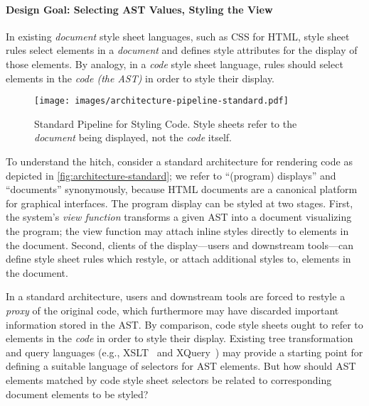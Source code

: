 \documentclass[acmsmall, screen]{acmart}
\newcommand{\parahead}[1]
  {\paragraph{\textbf{#1}}}
\begin{document}
\parahead{Design Goal: Selecting AST Values, Styling the View}

In existing \emph{document} style sheet languages, such as CSS for HTML, style sheet rules select elements in a \emph{document} and defines style attributes for the display of those elements.
By analogy, in a \emph{code} style sheet language,
rules should select elements in the \emph{code (the AST)} in order to style their display.

\begin{wrapfigure}[12]{r}{2.3in}
  \vspace{-0.09in} \texttt{[image: images/architecture-pipeline-standard.pdf]}
  \caption{
Standard Pipeline for Styling Code.
  Style sheets refer to the \emph{document} being displayed,
  not the \emph{code} itself.
}
  \label{fig:architecture-standard}
\end{wrapfigure}
 To understand the hitch, consider a standard architecture for rendering code as depicted in \autoref{fig:architecture-standard};
we refer to ``(program) displays'' and ``documents'' synonymously, because HTML documents are a canonical platform for graphical interfaces.
The program display can be styled at two stages.
First, the system's \emph{view function} transforms a given AST into a document visualizing the program; the view function may attach {inline styles} directly to elements in the document.
Second, clients of the display---users and downstream tools---can define style sheet rules which restyle, or attach {additional styles} to, elements in the document.


In a standard architecture,
users and downstream tools are forced to restyle a \emph{proxy} of the original code, which furthermore may have discarded important information stored in the AST.
By comparison, code style sheets ought to refer to elements in the \emph{code} in order to style their display.
Existing tree transformation and query languages (e.g., XSLT~\cite{XSLT} and XQuery~\cite{XQuery}) may provide a starting point for defining a suitable language of selectors for AST elements.
But how should {AST} elements matched by code style sheet selectors be related to corresponding {document} elements to be styled?
\end{document}
